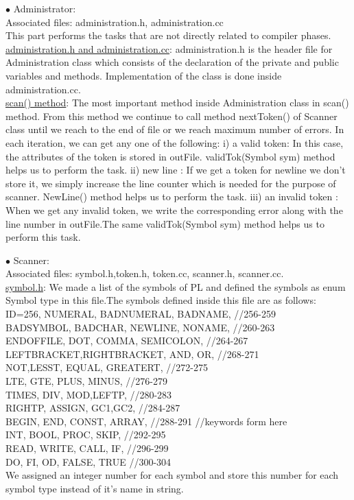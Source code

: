 \documentclass[paper=letter, fontsize=11pt]{scrartcl} %
\begin{document}
$\bullet$ Administrator:\\

Associated files: administration.h, administration.cc\\
This part performs the tasks that are not directly related to compiler phases.\\

\underline {administration.h and administration.cc}: administration.h is the header file for Administration class which consists of the declaration of the private and public variables and methods. Implementation of the class is done inside administration.cc.\\

\underline {scan() method}:  The most important method inside Administration class in scan() method. From this method we continue to call method nextToken() of Scanner class until we reach to the end of file or we reach maximum number of errors. In each iteration, we can get any one of the following:
	i)   a valid token: In this case, the attributes of the token is stored in outFile. validTok(Symbol sym) method helps us to perform the task.
	ii)  new line : If we get a token for newline we don't store it, we simply increase the line counter which is needed for the purpose of scanner. NewLine() method helps us to perform the task.
	iii) an invalid token : When we get any invalid token, we write the corresponding error along with the line number in outFile.The same validTok(Symbol sym) method helps us to perform this task.


$\bullet$ Scanner:\\

Associated files: symbol.h,token.h, token.cc, scanner.h, scanner.cc.\\

\underline {symbol.h}: We made a list of the symbols of PL and defined the symbols as enum Symbol type in this file.The symbols defined inside this file are as follows:\\

ID=256, NUMERAL, BADNUMERAL, BADNAME, //256-259\\ 
	BADSYMBOL, BADCHAR, NEWLINE, NONAME, //260-263\\
	ENDOFFILE, DOT, COMMA, SEMICOLON, //264-267\\
	LEFTBRACKET,RIGHTBRACKET, AND, OR, //268-271\\
	NOT,LESST, EQUAL, GREATERT, //272-275\\
	LTE, GTE, PLUS, MINUS, //276-279\\
	TIMES, DIV, MOD,LEFTP, //280-283\\
	RIGHTP, ASSIGN,	GC1,GC2, //284-287 \\
	BEGIN, END, CONST, ARRAY, //288-291  //keywords form here\\
	INT, BOOL, PROC, SKIP, //292-295\\
	READ, WRITE, CALL, IF, //296-299\\
	DO, FI, OD, FALSE, TRUE //300-304\\
We assigned an integer number for each symbol and store this number for each symbol type instead of it's name in string.\\
\end{document}
